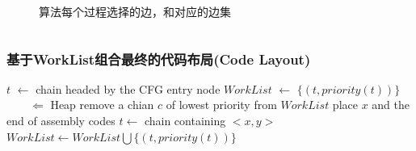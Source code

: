 \begin{frame}
\begin{columns}
\begin{column}{0.6\textwidth}
\begin{figure}
                \caption{算法每个过程选择的边，和对应的边集}
            \end{figure}
        \end{column}
    \end{columns}

\end{frame}


\begin{frame}
    \frametitle{基于WorkList组合最终的代码布局(Code Layout)}

    \begin{algorithmic}
        \State $t$ $\gets$ chain headed by the CFG entry node
\State $WorkList$ $\gets$ $\lbrace(t, priority(t))\rbrace$ $ \qquad \Leftarrow$ Heap\cite{forsythe1964algorithms}
        \State remove a chian $c$ of lowest priority from $WorkList$
        \State place $x$ and the end of assembly codes
        \EndFor
        \State $t \gets $ chain containing $<x, y>$
        $WorkList \gets WorkList \bigcup \lbrace (t, priority(t)) \rbrace$
        \EndIf
        \EndFor
        \EndFor
        \EndWhile
    \end{algorithmic}

\end{frame}


